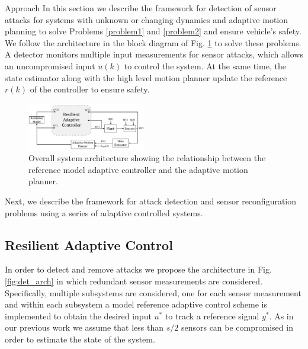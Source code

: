 
\begin{section}{Approach}
\label{sec:approach}
In this section we describe the framework for detection of sensor attacks for systems with unknown or changing dynamics and adaptive motion planning to solve Problems \ref{problem1} and \ref{problem2} and ensure vehicle's safety. We follow the architecture in the block diagram of Fig. \ref{fig:system_arch} to solve these problems. A detector monitors multiple input measurements for sensor attacks, which allows an uncompromised input $u(k)$ to control the system. At the same time, the state estimator along with the high level motion planner update the reference $r(k)$ of the controller to ensure safety. 

\begin{figure}[ht!]
\vspace{1pt}
\centering
\includegraphics[width=0.46\textwidth]{Figures/sys_arch.png}
\caption{Overall system architecture showing the relationship between the reference model adaptive controller and the adaptive motion planner.}
\label{fig:system_arch}
\end{figure}

Next, we describe the framework for attack detection and sensor reconfiguration problems using a series of adaptive controlled systems.

\subsection{Resilient Adaptive Control}
\label{sec:Res_adapt_control}


In order to detect and remove attacks we propose the architecture in Fig. \ref{fig:det_arch} in which redundant sensor measurements are considered. Specifically, multiple subsystems are considered, one for each sensor measurement and within each subsystem a model reference adaptive control scheme is implemented to obtain the desired input $u^*$ to track a reference signal $y^*$. As in our previous work \cite{6943080,6843720} we assume that less than $s/2$ sensors can be compromised in order to estimate the state of the system.



\end{section}
